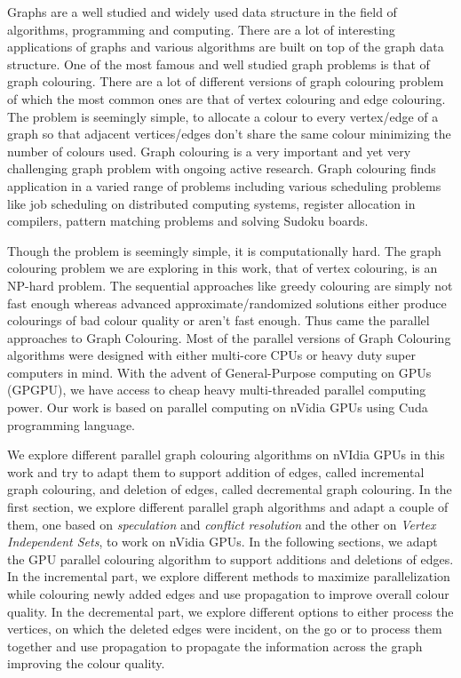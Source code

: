 \documentclass[MTech]{iitmdiss}
\begin{document}
\vspace*{24pt}

\noindent Graphs are a well studied and widely used data structure in the field of algorithms, programming and computing. There are a lot of interesting applications of graphs and various algorithms are built on top of the graph data structure. One of the most famous and well studied graph problems is that of graph colouring. There are a lot of different versions of graph colouring problem of which the most common ones are that of vertex colouring and edge colouring. The problem is seemingly simple, to allocate a colour to every vertex/edge of a graph so that adjacent vertices/edges don't share the same colour minimizing the number of colours used.  
Graph colouring is a very important and yet very challenging graph problem with ongoing active research. Graph colouring finds application in a varied range of problems including various scheduling problems like job scheduling on distributed computing systems, register allocation in compilers, pattern matching problems and solving Sudoku boards.

Though the problem is seemingly simple, it is computationally hard. The graph colouring problem we are exploring in this work, that of vertex colouring, is an NP-hard problem. The sequential approaches like greedy colouring are simply not fast enough whereas advanced approximate/randomized solutions either produce colourings of bad colour quality or aren't fast enough. Thus came the parallel approaches to Graph Colouring. Most of the parallel versions of Graph Colouring algorithms were designed with either multi-core CPUs or heavy duty super computers in mind. With the advent of General-Purpose computing on GPUs (GPGPU), we have access to cheap heavy multi-threaded parallel computing power. Our work is based on parallel computing on nVidia GPUs using Cuda programming language.

We explore different parallel graph colouring algorithms on nVIdia GPUs in this work and try to adapt them to support addition of edges, called incremental graph colouring, and deletion of edges, called decremental graph colouring. In the first section, we explore different parallel graph algorithms and adapt a couple of them, one based on \textit{speculation} and \textit{conflict resolution} and the other on \textit{Vertex Independent Sets}, to work on nVidia GPUs. In the following sections, we adapt the GPU parallel colouring algorithm to support additions and deletions of edges. In the incremental part, we explore different methods to maximize parallelization while colouring newly added edges and use propagation to improve overall colour quality. In the decremental part, we explore different options to either process the vertices, on which the deleted edges were incident, on the go or to process them together and use propagation to propagate the information across the graph improving the colour quality.  
\end{document}
